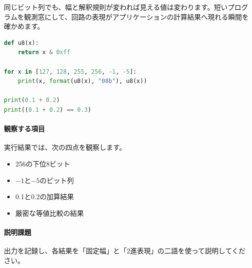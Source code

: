 同じビット列でも、幅と解釈規則が変われば見える値は変わります。短いプログラムを観測窓にして、回路の表現がアプリケーションの計算結果へ現れる瞬間を確かめます。

\begingroup
\begingroup
      \begin{lstlisting}[language=Python]
def u8(x):
    return x & 0xff

for x in [127, 128, 255, 256, -1, -5]:
    print(x, format(u8(x), "08b"), u8(x))

print(0.1 + 0.2)
print((0.1 + 0.2) == 0.3)
      \end{lstlisting}
\par
\endgroup
\medskip
\begingroup
\paragraph{観察する項目}
        実行結果では、次の四点を観察します。
        \begin{itemize}
          \item 256の下位8ビット
          \item $-1$と$-5$のビット列
          \item 0.1と0.2の加算結果
          \item 厳密な等値比較の結果
        \end{itemize}

\paragraph{説明課題}
        出力を記録し、各結果を「固定幅」と「2進表現」の二語を使って説明してください。

\par
\endgroup
\par
\endgroup


